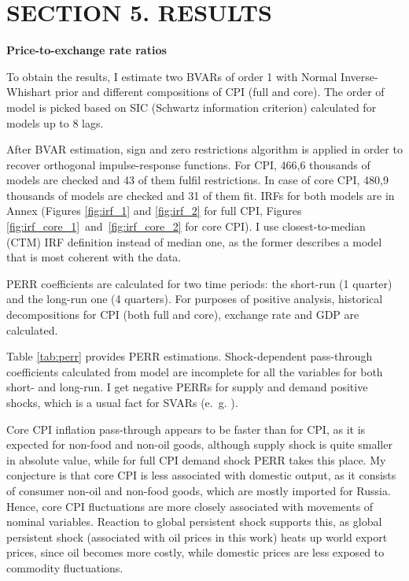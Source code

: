 \documentclass[12pt, a4paper]{extarticle}
\begin{document}
\clearpage
\section*{SECTION 5. RESULTS}
\setcounter{section}{4}
\setcounter{subsection}{0}

\begin{center}
	\textbf{Price-to-exchange rate ratios}
\end{center}

To obtain the results, I estimate two BVARs of order 1 with Normal Inverse-Whishart prior and different compositions of CPI (full and core). The order of model is picked based on SIC (Schwartz information criterion) calculated for models up to 8 lags.

After BVAR estimation, sign and zero restrictions algorithm is applied in order to recover orthogonal impulse-response functions. For CPI, 466,6 thousands of models are checked and 43 of them fulfil restrictions. In case of core CPI, 480,9 thousands of models are checked and 31 of them fit. IRFs for both models are in Annex (Figures \ref{fig:irf_1} and \ref{fig:irf_2} for full CPI, Figures \ref{fig:irf_core_1}~and~\ref{fig:irf_core_2} for core CPI). I use closest-to-median (CTM) IRF definition instead of median one, as the former describes a model that is most coherent with the data.

PERR coefficients are calculated for two time periods: the short-run (1 quarter) and the long-run one (4 quarters). For purposes of positive analysis, historical decompositions for CPI (both full and core), exchange rate and GDP are calculated.

Table \ref{tab:perr} provides PERR estimations. Shock-dependent pass-through coefficients calculated from model are incomplete for all the variables for both short- and long-run. I get negative PERRs for supply and demand positive shocks, which is a usual fact for SVARs (e.~g. \cite[p.~55]{Ortega2020}).

Core CPI inflation pass-through appears to be faster than for CPI, as it is expected for non-food and non-oil goods, although supply shock is quite smaller in absolute value, while for full CPI demand shock PERR takes this place. My conjecture is that core CPI is less associated with domestic output, as it consists of consumer non-oil and non-food goods, which are mostly imported for Russia. Hence, core CPI fluctuations are more closely associated with movements of nominal variables. Reaction to global persistent shock supports this, as global persistent shock (associated with oil prices in this work) heats up world export prices, since oil becomes more costly, while domestic prices are less exposed to commodity fluctuations. 
\end{document}
